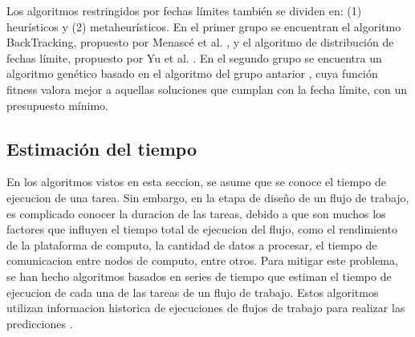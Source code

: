 Los algoritmos restringidos por fechas límites también se dividen en: (1) heurísticos y (2) metaheurísticos. En el primer grupo se encuentran el algoritmo BackTracking, propuesto por Menascé et al. \cite{menasce2004framework}, y el algoritmo de distribución de fechas límite, propuesto por Yu et al. \cite{yu2005cost}. En el segundo grupo se encuentra un algoritmo genético basado en el algoritmo del grupo antarior \cite{yu2006scheduling}, cuya función fitness valora mejor a aquellas soluciones que cumplan con la fecha límite, con un presupuesto mínimo.

\subsection{Estimación del tiempo}
En los algoritmos vistos en esta seccion, se asume que se conoce el tiempo de ejecucion de una tarea. Sin embargo, en la etapa de diseño de un flujo de trabajo, es complicado conocer la duracion de las tareas, debido a que son muchos los factores que influyen el tiempo total de ejecucion del flujo, como el rendimiento de la plataforma de computo, la cantidad de datos a procesar, el tiempo de comunicacion entre nodos de computo, entre otros. Para mitigar este problema, se han hecho algoritmos basados en series de tiempo que estiman el tiempo de ejecucion de cada una de las tareas de un flujo de trabajo. Estos algoritmos utilizan informacion historica de ejecuciones de flujos de trabajo para realizar las predicciones  \cite{liu2011novel}.
